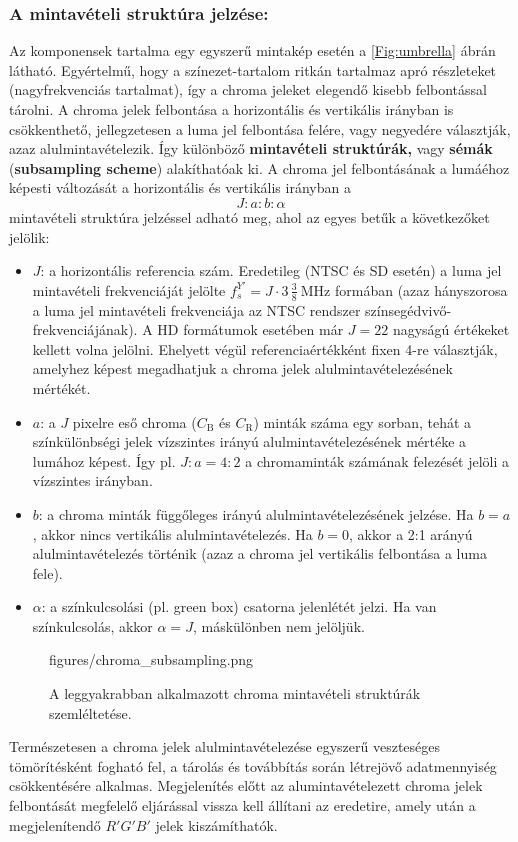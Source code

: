 \subsubsection*{A mintavételi struktúra jelzése:\\}
Az \ycbcr komponensek tartalma egy egyszerű mintakép esetén a \ref{Fig:umbrella} ábrán látható.
Egyértelmű, hogy a színezet-tartalom ritkán tartalmaz apró részleteket (nagyfrekvenciás tartalmat), így a chroma jeleket elegendő kisebb felbontással tárolni.
A chroma jelek felbontása a horizontális és vertikális irányban is csökkenthető, jellegzetesen a luma jel felbontása felére, vagy negyedére választják, azaz alulmintavételezik.
Így különböző \textbf{mintavételi struktúrák,} vagy \textbf{sémák} (\textbf{subsampling scheme}) alakíthatóak ki.
A chroma jel felbontásának a lumáéhoz képesti változását a horizontális és vertikális irányban a
\begin{equation}
J : a : b : \alpha
\end{equation}
mintavételi struktúra jelzéssel adható meg, ahol az egyes betűk a következőket jelölik:
\begin{itemize}
\item $J$: a horizontális referencia szám.
Eredetileg (NTSC és SD esetén) a luma jel mintavételi frekvenciáját jelölte $f^{Y'}_s = J \cdot 3\,\frac{3}{8}~\mathrm{MHz}$ formában (azaz hányszorosa a luma jel mintavételi frekvenciája az NTSC rendszer színsegédvivő-frekvenciájának).
A HD formátumok esetében már $J=22$ nagyságú értékeket kellett volna jelölni.
Ehelyett végül referenciaértékként fixen 4-re választják, amelyhez képest megadhatjuk a chroma jelek alulmintavételezésének mértékét.
\item $a$: a $J$ pixelre eső chroma ($C_{\mathrm{B}}$ és $C_{\mathrm{R}}$) minták száma egy sorban, tehát a színkülönbségi jelek vízszintes irányú alulmintavételezésének mértéke a lumához képest.
Így pl. $J:a= 4:2$ a chromaminták számának felezését jelöli a vízszintes irányban.
\item $b$: a chroma minták függőleges irányú alulmintavételezésének jelzése.
Ha $b = a$, akkor nincs vertikális alulmintavételezés.
Ha $b = 0$, akkor a 2:1 arányú alulmintavételezés történik (azaz a chroma jel vertikális felbontása a luma fele).
\item $\alpha$: a színkulcsolási (pl. green box) csatorna jelenlétét jelzi. 
Ha van színkulcsolás, akkor $\alpha = J$, máskülönben nem jelöljük.
\end{itemize}
\begin{figure}[]
	\centering
	\begin{overpic}[width = 1\columnwidth ]{figures/chroma_subsampling.png}
 	\end{overpic}
	\caption{A leggyakrabban alkalmazott chroma mintavételi struktúrák szemléltetése.}
	\label{Fig:chroma_subsampling}
\end{figure}
Természetesen a chroma jelek alulmintavételezése egyszerű veszteséges tömörítésként fogható fel, a tárolás és továbbítás során létrejövő adatmennyiség csökkentésére alkalmas.
Megjelenítés előtt az alumintavételezett chroma jelek felbontását megfelelő eljárással vissza kell állítani az eredetire, amely után a megjelenítendő $R'G'B'$ jelek kiszámíthatók.

